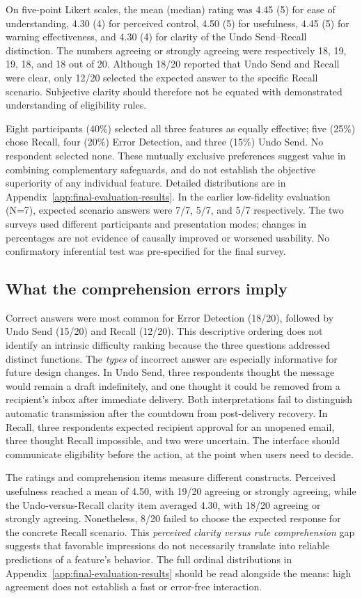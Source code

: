 \documentclass[letterpaper]{jdf}
\begin{document}
On five-point Likert scales, the mean (median) rating was 4.45 (5) for ease of understanding, 4.30 (4) for perceived control, 4.50 (5) for usefulness, 4.45 (5) for warning effectiveness, and 4.30 (4) for clarity of the Undo Send--Recall distinction. The numbers agreeing or strongly agreeing were respectively 18, 19, 19, 18, and 18 out of 20. Although 18/20 reported that Undo Send and Recall were clear, only 12/20 selected the expected answer to the specific Recall scenario. Subjective clarity should therefore not be equated with demonstrated understanding of eligibility rules.

Eight participants (40\%) selected all three features as equally effective; five (25\%) chose Recall, four (20\%) Error Detection, and three (15\%) Undo Send. No respondent selected none. These mutually exclusive preferences suggest value in combining complementary safeguards, and do not establish the objective superiority of any individual feature. Detailed distributions are in Appendix~\ref{app:final-evaluation-results}. In the earlier low-fidelity evaluation (N=7), expected scenario answers were 7/7, 5/7, and 5/7 respectively. The two surveys used different participants and presentation modes; changes in percentages are not evidence of causally improved or worsened usability. No confirmatory inferential test was pre-specified for the final survey.

\subsection{What the comprehension errors imply}
Correct answers were most common for Error Detection (18/20), followed by Undo Send (15/20) and Recall (12/20). This descriptive ordering does not identify an intrinsic difficulty ranking because the three questions addressed distinct functions. The \emph{types} of incorrect answer are especially informative for future design changes. In Undo Send, three respondents thought the message would remain a draft indefinitely, and one thought it could be removed from a recipient's inbox after immediate delivery. Both interpretations fail to distinguish automatic transmission after the countdown from post-delivery recovery. In Recall, three respondents expected recipient approval for an unopened email, three thought Recall impossible, and two were uncertain. The interface should communicate eligibility before the action, at the point when users need to decide.

The ratings and comprehension items measure different constructs. Perceived usefulness reached a mean of 4.50, with 19/20 agreeing or strongly agreeing, while the Undo-versus-Recall clarity item averaged 4.30, with 18/20 agreeing or strongly agreeing. Nonetheless, 8/20 failed to choose the expected response for the concrete Recall scenario. This \emph{perceived clarity versus rule comprehension} gap suggests that favorable impressions do not necessarily translate into reliable predictions of a feature's behavior. The full ordinal distributions in Appendix~\ref{app:final-evaluation-results} should be read alongside the means: high agreement does not establish a fast or error-free interaction.
\end{document}
